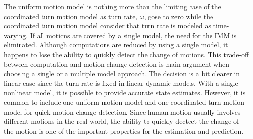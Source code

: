 \documentclass[letterpaper, 10 pt, conference]{ieeeconf}
\begin{document}
	The uniform motion model is nothing more than the limiting case of the coordinated turn motion model as turn rate, $\omega$, gose to zero while the coordinated turn motion model consider that turn rate is modeled as time-varying. If all motions are covered by a single model, the need for the IMM is eliminated. Although computations are reduced by using a single model, it happens to lose the ability to quickly detect the change of motions. This trade-off between computation and motion-change detection is main argument when choosing a single or a multiple model approach. The decision is a bit clearer in linear case since the turn rate is fixed in linear dynamic models. With a single nonlinear model, it is possible to provide accurate state estimates. However, it is common to include one uniform motion model and one coordinated turn motion model for quick motion-change detection. Since human motion usually involves different motions in the real world, the ability to quickly dectect the change of the motion is one of the important properties for the estimation and prediction.          
	
	
	
	
	
	
	
\end{document}
